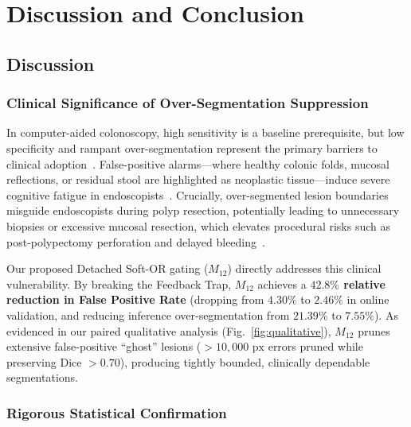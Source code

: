 \section{Discussion and Conclusion}
\label{sec:conclusion}

\subsection{Discussion}

\subsubsection{Clinical Significance of Over-Segmentation Suppression}
In computer-aided colonoscopy, high sensitivity is a baseline
prerequisite, but low specificity and rampant over-segmentation
represent the primary barriers to clinical
adoption~\cite{leufkens2012factors, mori2019real}. False-positive
alarms---where healthy colonic folds, mucosal reflections, or residual
stool are highlighted as neoplastic tissue---induce severe cognitive
fatigue in endoscopists~\cite{mori2019real, hassan2021overcoming}.
Crucially, over-segmented lesion boundaries misguide endoscopists during
polyp resection, potentially leading to unnecessary biopsies or excessive
mucosal resection, which elevates procedural risks such as
post-polypectomy perforation and delayed
bleeding~\cite{rex2017colorectal}.

Our proposed Detached Soft-OR gating ($M_{12}$) directly addresses this
clinical vulnerability. By breaking the Feedback Trap, $M_{12}$ achieves
a \textbf{$42.8\%$ relative reduction in False Positive Rate} (dropping
from $4.30\%$ to $2.46\%$ in online validation, and reducing inference
over-segmentation from $21.39\%$ to $7.55\%$). As evidenced in our
paired qualitative analysis (Fig.~\ref{fig:qualitative}), $M_{12}$
prunes extensive false-positive ``ghost'' lesions
($>10{,}000\text{ px}$ errors pruned while preserving
Dice $>0.70$), producing tightly bounded, clinically dependable
segmentations.

\subsubsection{Rigorous Statistical Confirmation}

